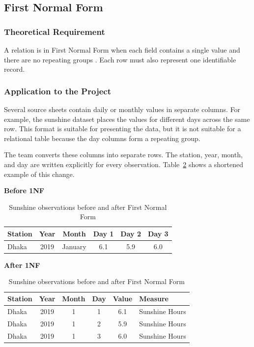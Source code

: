 \subsection{First Normal Form}
\label{subsec:first-normal-form}

\subsubsection{Theoretical Requirement}

A relation is in First Normal Form when each field contains a single value and
there are no repeating groups \cite{kent1983five}. Each row must also represent
one identifiable record.

\subsubsection{Application to the Project}

Several source sheets contain daily or monthly values in separate columns. For
example, the sunshine dataset places the values for different days across the
same row. This format is suitable for presenting the data, but it is not
suitable for a relational table because the day columns form a repeating
group.

The team converts these columns into separate rows. The station, year, month,
and day are written explicitly for every observation. Table~\ref{tab:1nf-example}
shows a shortened example of this change.

\begin{table}[H]
\centering
\caption{Sunshine observations before and after First Normal Form}
\label{tab:1nf-example}
\small
\renewcommand{\arraystretch}{1.2}

\textbf{Before 1NF}\\[2mm]

\begin{tabular}{@{}lccccc@{}}
\toprule
\textbf{Station} &
\textbf{Year} &
\textbf{Month} &
\textbf{Day 1} &
\textbf{Day 2} &
\textbf{Day 3} \\
\midrule
Dhaka & 2019 & January & 6.1 & 5.9 & 6.0 \\
\bottomrule
\end{tabular}

\vspace{5mm}

\textbf{After 1NF}\\[2mm]

\begin{tabular}{@{}lccccl@{}}
\toprule
\textbf{Station} &
\textbf{Year} &
\textbf{Month} &
\textbf{Day} &
\textbf{Value} &
\textbf{Measure} \\
\midrule
Dhaka & 2019 & 1 & 1 & 6.1 & Sunshine Hours \\
Dhaka & 2019 & 1 & 2 & 5.9 & Sunshine Hours \\
Dhaka & 2019 & 1 & 3 & 6.0 & Sunshine Hours \\
\bottomrule
\end{tabular}
\end{table}

